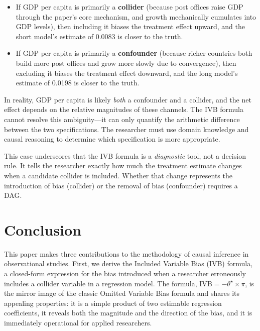 \documentclass[
]{article}
\begin{document}
\begin{itemize}
\item If GDP per capita is primarily a \textbf{collider} (because post offices raise GDP through the paper's core mechanism, and growth mechanically cumulates into GDP levels), then including it biases the treatment effect upward, and the short model's estimate of 0.0083 is closer to the truth.

\item If GDP per capita is primarily a \textbf{confounder} (because richer countries both build more post offices and grow more slowly due to convergence), then excluding it biases the treatment effect downward, and the long model's estimate of 0.0198 is closer to the truth.
\end{itemize}

In reality, GDP per capita is likely \textit{both} a confounder and a
collider, and the net effect depends on the relative magnitudes of these
channels. The IVB formula cannot resolve this ambiguity---it can only
quantify the arithmetic difference between the two specifications. The
researcher must use domain knowledge and causal reasoning to determine
which specification is more appropriate.

This case underscores that the IVB formula is a \textit{diagnostic}
tool, not a decision rule. It tells the researcher exactly how much the
treatment estimate changes when a candidate collider is included.
Whether that change represents the introduction of bias (collider) or
the removal of bias (confounder) requires a DAG.

\section{\texorpdfstring{Conclusion
\label{sec:conclusion}}{Conclusion }}\label{conclusion}

This paper makes three contributions to the methodology of causal
inference in observational studies. First, we derive the Included
Variable Bias (IVB) formula, a closed-form expression for the bias
introduced when a researcher erroneously includes a collider variable in
a regression model. The formula,
\(\text{IVB} = -\theta^{\star} \times \pi\), is the mirror image of the
classic Omitted Variable Bias formula and shares its appealing
properties: it is a simple product of two estimable regression
coefficients, it reveals both the magnitude and the direction of the
bias, and it is immediately operational for applied researchers.
\end{document}
